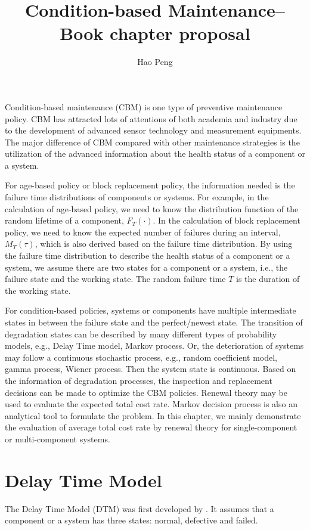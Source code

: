 \documentclass[10pt,a4paper]{article}
\author{Hao Peng}
\title{Condition-based Maintenance--Book chapter proposal}
\theoremstyle{remark}
\begin{document}
\maketitle
Condition-based maintenance (CBM) is one type of preventive maintenance policy. CBM has attracted lots of attentions of both academia and industry due to the development of advanced sensor technology and measurement equipments. The major difference of CBM compared with other maintenance strategies is the utilization of the advanced information about the health status of a component or a system. 

For age-based policy or block replacement policy, the information needed is the failure time distributions of components or systems. For example, in the calculation of age-based policy, we need to know the distribution function of the random lifetime of a component, $F_{T}(\cdot)$. In the calculation of block replacement policy, we need to know the expected number of failures during an interval, $M_{T}(\tau)$, which is also derived based on the failure time distribution. By using the failure time distribution to describe the health status of a component or a system, we assume there are two states for a component or a system, i.e., the failure state and the working state. The random failure time $T$ is the duration of the working state.

For condition-based policies, systems or components have multiple intermediate states in between the failure state and the perfect/newest state. The transition of degradation states can be described by many different types of probability models, e.g., Delay Time model, Markov process. Or, the deterioration of systems may follow a continuous stochastic process, e.g., random coefficient model, gamma process, Wiener process. Then the system state is continuous. Based on the information of degradation processes, the inspection and replacement decisions can be made to optimize the CBM policies. Renewal theory may be used to evaluate the expected total cost rate. Markov decision process is also an analytical tool to formulate the problem. In this chapter, we mainly demonstrate the evaluation of average total cost rate by renewal theory for single-component or multi-component systems. 

\section{Delay Time Model}
The Delay Time Model (DTM) was first developed by \cite{ChristerWaller84}. It assumes that a component or a system has three states: normal, defective and failed. 
\end{document}
